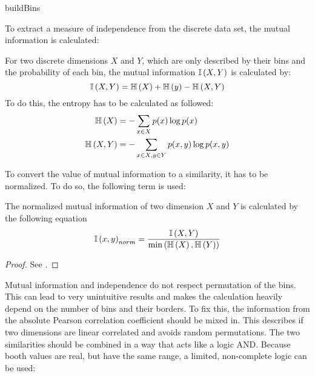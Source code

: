 \begin{algorithm}



	\caption{buildBins}
	\label{alg:buildBins}
\end{algorithm}

To extract a measure of independence from the discrete data set, the mutual information is calculated:

\begin{envdef}
	For two discrete dimensions $X$ and $Y$, which are only described by their bins and the probability of each bin, the mutual information $\mathbb{I}\left(X,Y\right)$ is calculated by:
	\begin{equation}
		\mathbb{I}\left(X,Y\right) = \mathbb{H}\left(X\right) + \mathbb{H}\left(y\right) - \mathbb{H}\left(X,Y\right)
	\end{equation}
	To do this, the entropy has to be calculated as followed:
	\begin{align}
		\mathbb{H}\left(X\right) &= - \sum_{x \in X} p(x) \log{p(x)}\\
		\mathbb{H}\left(X,Y\right) &= - \sum_{x \in X, y \in Y} p(x,y) \log{p(x,y)}
	\end{align}
\end{envdef}

To convert the value of mutual information to a similarity, it has to be normalized. To do so, the following term is used:

\begin{envtheo}
	The normalized mutual information of two dimension $X$ and $Y$ is calculated by the following equation
	\begin{equation}
		\mathbb{I}\left(x,y\right)_{norm} = \frac{\mathbb{I}\left(X,Y\right)}{\min{\left( \mathbb{H}\left(X\right), \mathbb{H}\left(Y\right) \right)}}
	\end{equation}
\end{envtheo}
\begin{proof}
	See \cite{mutual}.
\end{proof}

Mutual information and independence do not respect permutation of the bins. This can lead to very unintuitive results and makes the calculation heavily depend on the number of bins and their borders. To fix this, the information from the absolute Pearson correlation coefficient should be mixed in. This describes if two dimensions are linear correlated and avoids random permutations. The two similarities should be combined in a way that acts like a logic AND. Because booth values are real, but have the same range, a limited, non-complete logic can be used:


